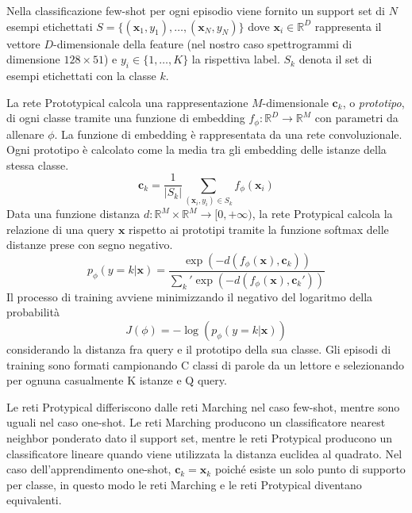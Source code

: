 \documentclass[12pt,a4paper,titlepage]{article}
\begin{document}
Nella classificazione few-shot per ogni episodio viene fornito un support set di $N$ esempi etichettati  $S=\{(\mathbf{x}_1,y_1), \dots,(\mathbf{x}_N,y_N)\}$ dove $\mathbf{x}_i\in \mathbb{R}^D$ rappresenta il vettore $D$-dimensionale della feature (nel nostro caso spettrogrammi di dimensione $128 \times 51$) e $y_i \in \{1, \dots, K\}$ la rispettiva label. $S_k$ denota il set di esempi etichettati con la classe $k$.

La rete Prototypical calcola una rappresentazione $M$-dimensionale $\mathbf{c}_k$, o \emph{prototipo}, di ogni classe tramite una funzione di embedding $f_\phi : \mathbb{R}^D \rightarrow \mathbb{R}^M$ con parametri da allenare $\phi$. La funzione di embedding è rappresentata da una rete convoluzionale. Ogni prototipo è calcolato come la media tra gli embedding delle istanze della stessa classe.
\begin{equation}
	\mathbf{c}_k=\frac{1}{|S_k|}\sum_{(\mathbf{x}_i,y_i)\in S_k}f_\phi (\mathbf{x}_i)
\end{equation}
Data una funzione distanza $d: \mathbb{R}^M \times \mathbb{R}^M \rightarrow [0, +\infty )$, la rete Protypical calcola la relazione di una query $\mathbf{x}$ rispetto ai prototipi tramite la funzione softmax delle distanze prese con segno negativo.
\begin{equation}\label{eq:softmax}
p_\phi(y=k|\mathbf{x})=\dfrac{\exp(-d(f_\phi(\mathbf{x}),\mathbf{c}_k))}{\sum_k' \exp(-d(f_\phi(\mathbf{x}),\mathbf{c}_k'))}
\end{equation}
Il processo di training avviene minimizzando il negativo del logaritmo della probabilità
\begin{equation}\label{eq:loss_proto}
	J(\phi)=-\log\left(p_\phi(y=k|\mathbf{x})\right)
\end{equation}
considerando la distanza fra query e il prototipo della sua classe.
Gli episodi di training sono formati campionando C classi di parole da un lettore e selezionando per ognuna casualmente K istanze e Q query.

Le reti Protypical differiscono dalle reti Marching nel caso few-shot, mentre sono uguali nel caso one-shot. Le reti Marching producono un classificatore nearest neighbor ponderato dato il support set, mentre le reti Protypical producono un classificatore lineare quando viene utilizzata la distanza euclidea al quadrato. Nel caso dell'apprendimento one-shot, $\mathbf{c}_k = \mathbf{x}_k$ poiché esiste un solo punto di supporto per classe, in questo modo le reti Marching e le reti Protypical diventano equivalenti.
\end{document}
